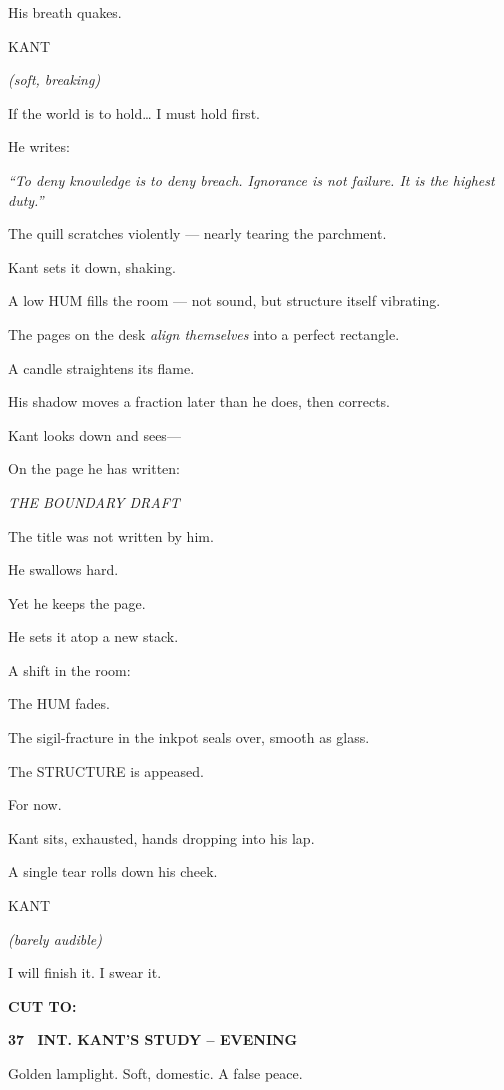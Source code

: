\documentclass[12pt]{article}
\newcommand{\scene}[2]{%
  \vspace{1.8\baselineskip}%
  \noindent\textbf{#1 \ #2}\par\vspace{0.4\baselineskip}%
}
\newenvironment{dialogue}[1]{%
  \vspace{0.8\baselineskip}%
  \noindent\hspace*{2.3in}\textsc{#1}\par%
  \noindent\hspace*{1.5in}\begin{minipage}[t]{4.5in}%
}{%
  \end{minipage}\par%
}
\newcommand{\paren}[1]{%
  \noindent\hspace*{1.8in}\textit{(#1)}\par%
}
\newcommand{\transition}[1]{%
  \vspace{0.6\baselineskip}%
  \begin{flushright}\textbf{#1}\end{flushright}%
}
\begin{document}
His breath quakes.

\begin{dialogue}{KANT}
\paren{soft, breaking}
If the world is to hold\ldots  
I must hold first.
\end{dialogue}

He writes:

\textit{
“To deny knowledge is to deny breach.  
Ignorance is not failure.  
It is the highest duty.”}

The quill scratches violently — nearly tearing the parchment.

Kant sets it down, shaking.

A low HUM fills the room — not sound, but structure itself vibrating.

The pages on the desk \emph{align themselves} into a perfect rectangle.

A candle straightens its flame.

His shadow moves a fraction later than he does, then corrects.

Kant looks down and sees—

On the page he has written:

\textit{THE BOUNDARY DRAFT}

The title was not written by him.

He swallows hard.

Yet he keeps the page.

He sets it atop a new stack.

A shift in the room:

The HUM fades.

The sigil-fracture in the inkpot seals over, smooth as glass.

The STRUCTURE is appeased.

For now.

Kant sits, exhausted, hands dropping into his lap.

A single tear rolls down his cheek.

\begin{dialogue}{KANT}
\paren{barely audible}
I will finish it.  
I swear it.
\end{dialogue}

\transition{CUT TO:}


\scene{37}{INT. KANT'S STUDY -- EVENING}

Golden lamplight. Soft, domestic. A false peace.
\end{document}
